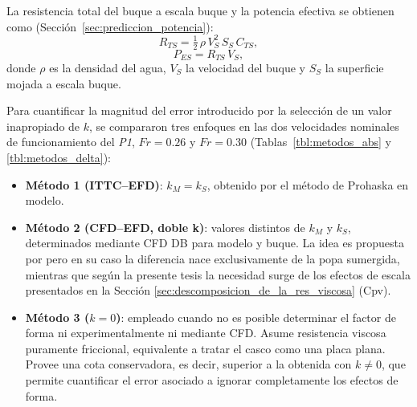 La resistencia total del buque a escala buque y la potencia efectiva se 
obtienen como (Sección~\ref{sec:prediccion_potencia}):
%
\begin{equation}
    R_{TS} = \tfrac{1}{2}\,\rho\,V_S^2\,S_S\,C_{TS},
\end{equation}
%
\begin{equation}
    P_{ES} = R_{TS}\,V_S,
\end{equation}
%
donde $\rho$ es la densidad del agua, $V_S$ la velocidad del buque y $S_S$ 
la superficie mojada a escala buque.

Para cuantificar la magnitud del error introducido por la selección de un valor inapropiado de $k$, se compararon tres enfoques en las dos velocidades nominales de funcionamiento del \textit{P1}, $Fr = 0{.}26$ y $Fr = 0{.}30$ (Tablas~\ref{tbl:metodos_abs} y \ref{tbl:metodos_delta}):

\begin{itemize}
    \item \textbf{Método 1 (ITTC–EFD)}: $k_M = k_S$, obtenido por el método de Prohaska en modelo.
    \item \textbf{Método 2 (CFD–EFD, doble k)}: valores distintos de $k_M$ y $k_S$, determinados mediante CFD DB para modelo y buque. La idea es propuesta por \cite{korkmaz_wetted_transom} pero en su caso la diferencia nace exclusivamente de la popa sumergida, mientras que según la presente tesis la necesidad surge de los efectos de escala presentados en la Sección \ref{sec:descomposicion_de_la_res_viscosa} (Cpv).
    \item \textbf{Método 3 ($k = 0$)}: empleado cuando no es posible determinar el factor de forma ni experimentalmente ni mediante CFD. Asume resistencia viscosa puramente friccional, equivalente a tratar el casco como una placa plana. Provee una cota conservadora, es decir, superior a la obtenida con $k \neq 0$, que permite cuantificar el error asociado a ignorar completamente los efectos de forma.

\end{itemize}

